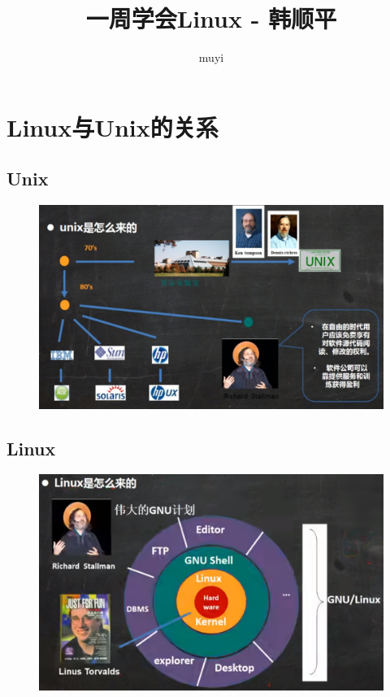 \documentclass[11pt]{article}
\title{一周学会Linux - 韩顺平}
\author{muyi}
\begin{document}
\maketitle


\section{Linux与Unix的关系}

\subsection{Unix}
\begin{figure}[htb]
    \centering
    \includegraphics[scale=0.12]{imgs/unix.png}
\end{figure}

\subsection{Linux}
\begin{figure}[htb]
    \centering
    \includegraphics[scale=0.12]{imgs/gnu_linux.png}
\end{figure}
\end{document}
